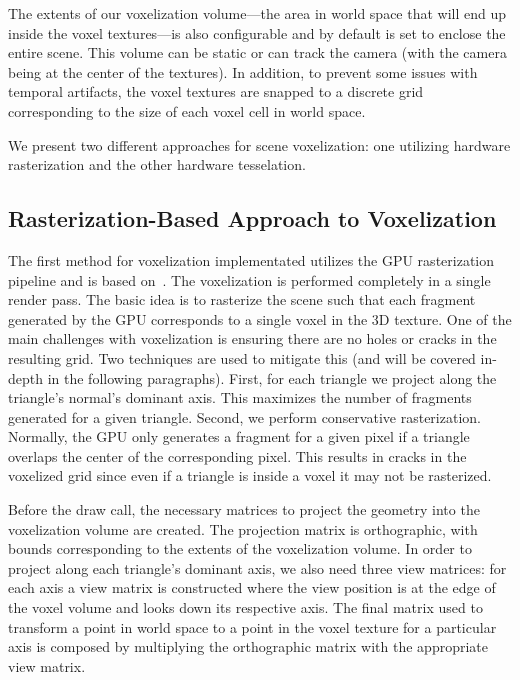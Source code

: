 The extents of our voxelization volume---the area in world space that will end up inside the voxel textures---is also configurable and by default is set to enclose the entire scene. This volume can be static or can track the camera (with the camera being at the center of the textures). In addition, to prevent some issues with temporal artifacts, the voxel textures are snapped to a discrete grid corresponding to the size of each voxel cell in world space.

We present two different approaches for scene voxelization: one utilizing hardware rasterization and the other hardware tesselation.

\subsection{Rasterization-Based Approach to Voxelization}
The first method for voxelization implementated utilizes the GPU rasterization pipeline and is based on~\cite{crassin2012octree}. The voxelization is performed completely in a single render pass. The basic idea is to rasterize the scene such that each fragment generated by the GPU corresponds to a single voxel in the 3D texture.
One of the main challenges with voxelization is ensuring there are no holes or cracks in the resulting grid. Two techniques are used to mitigate this (and will be covered in-depth in the following paragraphs). First, for each triangle we project along the triangle's normal's dominant axis. This maximizes the number of fragments generated for a given triangle. Second, we perform conservative rasterization. Normally, the GPU only generates a fragment for a given pixel if a triangle overlaps the center of the corresponding pixel. This results in cracks in the voxelized grid since even if a triangle is inside a voxel it may not be rasterized.

Before the draw call, the necessary matrices to project the geometry into the voxelization volume are created. The projection matrix is orthographic, with bounds corresponding to the extents of the voxelization volume. In order to project along each triangle's dominant axis, we also need three view matrices: for each axis a view matrix is constructed where the view position is at the edge of the voxel volume and looks down its respective axis. The final matrix used to transform a point in world space to a point in the voxel texture for a particular axis is composed by multiplying the orthographic matrix with the appropriate view matrix.

